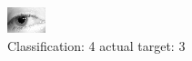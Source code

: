 \begin{figure}[h!]
\begin{center}
\includegraphics[width=0.60\columnwidth]{figures/ID1344_class_4_target_3.png}
\end{center}
\caption{ Classification: 4 actual target: 3}
\label{fig:ID1344_class_4_target_3}
\end{figure}
